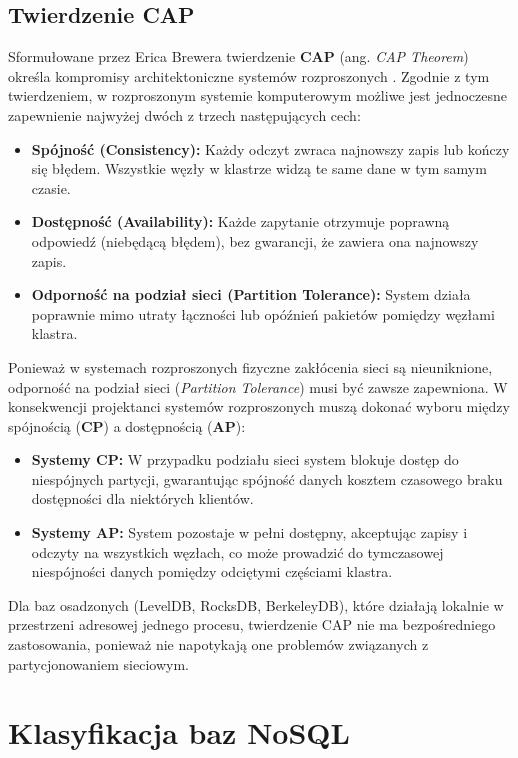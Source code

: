 \subsection{Twierdzenie CAP}
Sformułowane przez Erica Brewera twierdzenie \textbf{CAP} (ang. \emph{CAP Theorem}) określa kompromisy architektoniczne systemów rozproszonych \cite{sadalage2012}. Zgodnie z tym twierdzeniem, w rozproszonym systemie komputerowym możliwe jest jednoczesne zapewnienie najwyżej dwóch z trzech następujących cech:
\begin{itemize}
    \item \textbf{Spójność (Consistency):} Każdy odczyt zwraca najnowszy zapis lub kończy się błędem. Wszystkie węzły w klastrze widzą te same dane w tym samym czasie.
    \item \textbf{Dostępność (Availability):} Każde zapytanie otrzymuje poprawną odpowiedź (niebędącą błędem), bez gwarancji, że zawiera ona najnowszy zapis.
    \item \textbf{Odporność na podział sieci (Partition Tolerance):} System działa poprawnie mimo utraty łączności lub opóźnień pakietów pomiędzy węzłami klastra.
\end{itemize}

Ponieważ w systemach rozproszonych fizyczne zakłócenia sieci są nieuniknione, odporność na podział sieci (\emph{Partition Tolerance}) musi być zawsze zapewniona. W konsekwencji projektanci systemów rozproszonych muszą dokonać wyboru między spójnością (\textbf{CP}) a dostępnością (\textbf{AP}):
\begin{itemize}
    \item \textbf{Systemy CP:} W przypadku podziału sieci system blokuje dostęp do niespójnych partycji, gwarantując spójność danych kosztem czasowego braku dostępności dla niektórych klientów.
    \item \textbf{Systemy AP:} System pozostaje w pełni dostępny, akceptując zapisy i odczyty na wszystkich węzłach, co może prowadzić do tymczasowej niespójności danych pomiędzy odciętymi częściami klastra.
\end{itemize}
Dla baz osadzonych (LevelDB, RocksDB, BerkeleyDB), które działają lokalnie w przestrzeni adresowej jednego procesu, twierdzenie CAP nie ma bezpośredniego zastosowania, ponieważ nie napotykają one problemów związanych z partycjonowaniem sieciowym.

\section{Klasyfikacja baz NoSQL}
